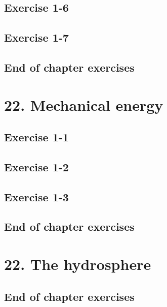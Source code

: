 \subsection{Exercise 1-6}
\subsection{Exercise 1-7}
\subsection{End of chapter exercises}
\section{22. Mechanical energy}
\subsection{Exercise 1-1}
\subsection{Exercise 1-2}
\subsection{Exercise 1-3}
\subsection{End of chapter exercises}
\section{22. The hydrosphere}
\subsection{End of chapter exercises}